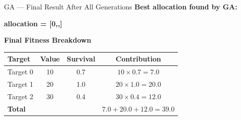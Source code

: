 \documentclass[aspectratio=169]{beamer}
\begin{document}
\begin{frame}{GA --- Final Result After All Generations}
  {\small\bfseries\color{navy} Best allocation found by GA:}\\[6pt]


  \vspace{0.2cm}
  \colorbox{amber}{\color{white}\bfseries\small
    allocation = [0,,]}

  \vspace{0.3cm}
  \colorbox{navymid}{\color{teallt}\bfseries\small Final Fitness Breakdown}
  \vspace{3pt}

  \begin{tabular}{lccc}
    \toprule
    \rowcolor{navy}
      \color{white}\bfseries Target &
      \color{white}\bfseries Value &
      \color{white}\bfseries Survival &
      \color{white}\bfseries Contribution \\
    \midrule
    Target 0 & 10 & 0.7 & $10\times0.7 = 7.0$ \\
    Target 1 & 20 & 1.0 & $20\times1.0 = 20.0$ \\
    Target 2 & 30 & 0.4 & $30\times0.4 = 12.0$ \\
    \midrule
    \rowcolor{teal}
      \color{white}\bfseries Total & & &
      \color{white}\bfseries $7.0+20.0+12.0 = 39.0$ \\
    \bottomrule
  \end{tabular}
\end{frame}
\end{document}
